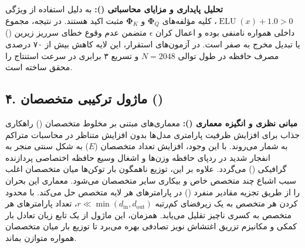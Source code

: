 \textbf{تحلیل پایداری و مزایای محاسباتی ():}
به دلیل استفاده از ویژگی $\operatorname{ELU}(x) + 1.0 > 0$، کلیه مؤلفه‌های $\mathbf{\Phi}_Q$ و $\mathbf{\Phi}_K$ مثبت اکید هستند. در نتیجه، مجموع داخلی همواره نامنفی بوده و اعمال کران $\epsilon$ متضمن عدم وقوع خطای سرریز زیرین () یا تبدیل مخرج به صفر است. در آزمون‌های استقرار، این لایه کاهش بیش از ۷۰ درصدی مصرف حافظه در طول توالی $N = 2048$ و تسریع ۳ برابری در سرعت استنتاج را محقق ساخته است.



\subsection*{۴. ماژول ترکیبی متخصصان  ()}

\textbf{مبانی نظری و انگیزه معماری ():}
معماری‌های مبتنی بر مخلوط متخصصان () راهکاری جذاب برای افزایش ظرفیت پارامتری مدل‌ها بدون افزایش متناظر در محاسبات متراکم به شمار می‌روند. با این وجود، افزایش تعداد متخصصان ($E$) به شکل سنتی منجر به انفجار شدید در ردپای حافظه وزن‌ها و اشغال وسیع حافظه اختصاصی پردازنده گرافیکی () می‌گردد. علاوه بر این، توزیع ناهمگون بار توکن‌ها میان متخصصان اغلب سبب اشباع چند متخصص خاص و بیکاری سایر متخصصان می‌شود.
معماری  این بحران را از طریق تجزیه مقادیر منفرد () در پارامترهای هر لایه متخصص حل می‌کند. با محدود کردن هر متخصص به یک زیرفضای کم‌رتبه $r \ll \min(d_{\text{in}}, d_{\text{out}})$، تعداد پارامترهای هر متخصص به کسری ناچیز تقلیل می‌یابد. همزمان، این ماژول از یک تابع زیان تعادل بار کمکی و مکانیزم تزریق اغتشاش نویز تصادفی بهره می‌برد تا توزیع بار میان متخصصان همواره متوازن بماند.

